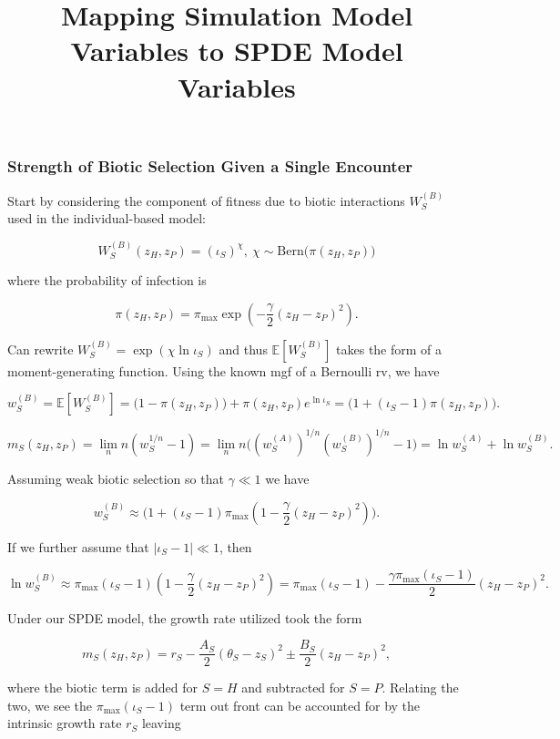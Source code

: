 \documentclass[
]{article}
\title{Mapping Simulation Model Variables to SPDE Model Variables}
\author{}
\date{\vspace{-2.5em}}
\begin{document}
\maketitle

\hypertarget{strength-of-biotic-selection-given-a-single-encounter}{%
\subsubsection{Strength of Biotic Selection Given a Single
Encounter}\label{strength-of-biotic-selection-given-a-single-encounter}}

Start by considering the component of fitness due to biotic interactions
\(W_S^{(B)}\) used in the individual-based model:

\[W_S^{(B)}(z_H,z_P)=(\iota_S)^\chi, \ \chi\sim\mathrm{Bern}\big(\pi(z_H,z_P)\big)\]

where the probability of infection is

\[\pi(z_H,z_P)=\pi_{\max}\exp\left(-\frac{\gamma}{2}(z_H-z_P)^2\right).\]

Can rewrite \(W_S^{(B)}=\exp(\chi\ln\iota_S)\) and thus
\(\mathbb E[W_S^{(B)}]\) takes the form of a moment-generating function.
Using the known mgf of a Bernoulli rv, we have

\[w_S^{(B)}=\mathbb E[W_S^{(B)}]=\big(1-\pi(z_H,z_P)\big)+\pi(z_H,z_P)e^{\ln\iota_S}=\Big(1+(\iota_S-1)\pi(z_H,z_P)\Big).\]

\[m_S(z_H,z_P)=\lim_nn(w_S^{1/n}-1)=\lim_nn\Big((w_S^{(A)})^{1/n}(w_S^{(B)})^{1/n}-1\Big)=\ln w_S^{(A)}+\ln w_S^{(B)}.\]

Assuming weak biotic selection so that \(\gamma\ll1\) we have

\[w_S^{(B)}\approx\Big(1+(\iota_S-1)\pi_{\max}\left(1-\frac{\gamma}{2}(z_H-z_P)^2\right)\Big).\]

If we further assume that \(|\iota_S-1|\ll1\), then

\[\ln w_S^{(B)}\approx\pi_{\max}(\iota_S-1)\left(1-\frac{\gamma}{2}(z_H-z_P)^2\right)=\pi_{\max}(\iota_S-1)-\frac{\gamma\pi_{\max}(\iota_S-1)}{2}(z_H-z_P)^2.\]

Under our SPDE model, the growth rate utilized took the form

\[m_S(z_H,z_P)=r_S-\frac{A_S}{2}(\theta_S-z_S)^2\pm\frac{B_S}{2}(z_H-z_P)^2,\]

where the biotic term is added for \(S=H\) and subtracted for \(S=P\).
Relating the two, we see the \(\pi_{\max}(\iota_S-1)\) term out front
can be accounted for by the intrinsic growth rate \(r_S\) leaving
\end{document}
